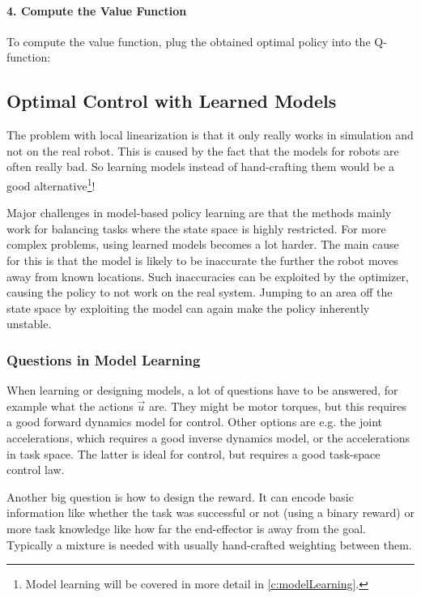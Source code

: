 				\paragraph{4. Compute the Value Function}
					To compute the value function, plug the obtained optimal policy into the Q-function:


		\subsection{Optimal Control with Learned Models}
			The problem with local linearization is that it only really works in simulation and not on the real robot. This is caused by the fact that the models for robots are often really bad. So learning models instead of hand-crafting them would be a good alternative\footnote{Model learning will be covered in more detail in \autoref{c:modelLearning}.}!

			Major challenges in model-based policy learning are that the methods mainly work for balancing tasks where the state space is highly restricted. For more complex problems, using learned models becomes a lot harder. The main cause for this is that the model is likely to be inaccurate the further the robot moves away from known locations. Such inaccuracies can be exploited by the optimizer, causing the policy to not work on the real system. Jumping to an area off the state space by exploiting the model can again make the policy inherently unstable.

			\subsubsection{Questions in Model Learning}
				When learning or designing models, a lot of questions have to be answered, for example what the actions \(\vec{u}\) are. They might be motor torques, but this requires a good forward dynamics model for control. Other options are e.g. the joint accelerations, which requires a good inverse dynamics model, or the accelerations in task space. The latter is ideal for control, but requires a good task-space control law.

				Another big question is how to design the reward. It can encode basic information like whether the task was successful or not (using a binary reward) or more task knowledge like how far the end-effector is away from the goal. Typically a mixture is needed with usually hand-crafted weighting between them.

